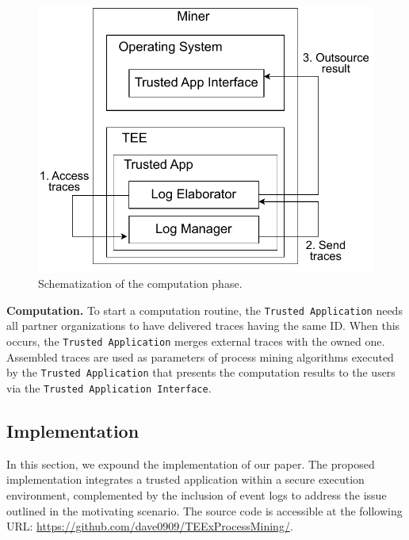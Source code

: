 \begin{figure}
   \vspace{-2em}
  \centering
  \includegraphics[width=1\textwidth]{content/figures/computationworkflow.pdf}
  \caption[A gull]{Schematization of the computation phase.}
  \vspace{-6pt}
\end{figure}
\textbf{Computation.} To start a computation routine, the \texttt{Trusted Application} needs all partner organizations to have delivered traces having the same ID. When this occurs, the \texttt{Trusted Application} merges external traces with the owned one. Assembled traces are used as parameters of process mining algorithms executed by the \texttt{Trusted Application} that presents the computation results to the users via the \texttt{Trusted Application Interface}.







\subsection{Implementation}
\label{sec:implementation:details}
In this section, we expound the implementation of our paper. The proposed implementation integrates a trusted application within a secure execution environment, complemented by the inclusion of event logs to address the issue outlined in the motivating scenario. The source code is accessible at the following URL: \url{https://github.com/dave0909/TEExProcessMining/}.


